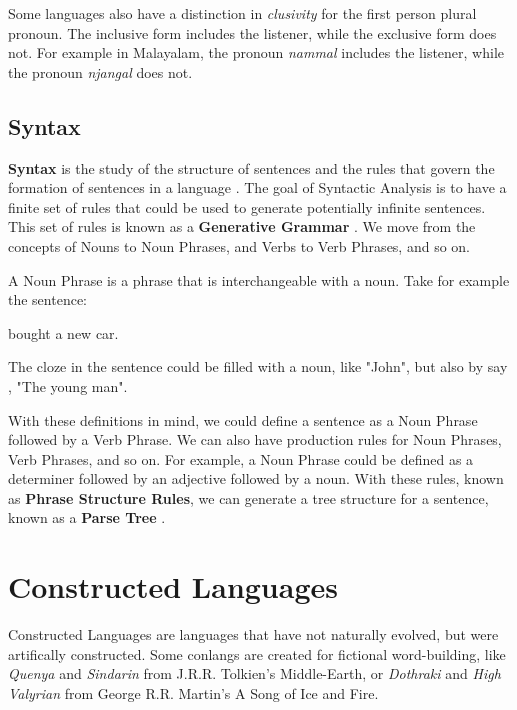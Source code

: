 Some languages also have a distinction in \textit{clusivity} for the first person plural pronoun. The inclusive form includes the listener, while the exclusive form does not.
For example in Malayalam, the pronoun \textit{nammal} includes the listener, while the pronoun \textit{njangal} does not.

\subsection{Syntax}
\textbf{Syntax} is the study of the structure of sentences and the rules that govern the formation of sentences in a language \cite{trask2007language}.
The goal of Syntactic Analysis is to have a finite set of rules that could be used to generate potentially infinite sentences. This set of rules is known as 
a \textbf{Generative Grammar} \cite{yule2020StudyLanguage}. We move from the concepts of Nouns to Noun Phrases, and Verbs to Verb Phrases, and so on.

A Noun Phrase is a phrase that is interchangeable with a noun. Take for example the sentence:

\begin{center}
    \underline{\hspace{2cm}} bought a new car.
\end{center}

The cloze in the sentence could be filled with a noun, like "John", but also by say , "The young man".

With these definitions in mind, we could define a sentence as a Noun Phrase followed by a Verb Phrase. We can also have production rules for 
Noun Phrases, Verb Phrases, and so on. For example, a Noun Phrase could be defined as a determiner followed by an adjective followed by a noun.
With these rules, known as \textbf{Phrase Structure Rules}, we can generate a tree structure for a sentence, known as a \textbf{Parse Tree} \cite{jm3}.





\section{Constructed Languages}
Constructed Languages are languages that have not naturally evolved, but were artifically constructed. Some conlangs are created for fictional word-building,
like \textit{Quenya} and \textit{Sindarin} from J.R.R. Tolkien's Middle-Earth, or \textit{Dothraki} and \textit{High Valyrian} from George R.R. Martin's A Song of Ice and Fire.

